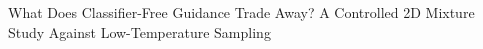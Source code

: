 What Does Classifier-Free Guidance Trade Away? A Controlled 2D Mixture Study Against Low-Temperature Sampling
